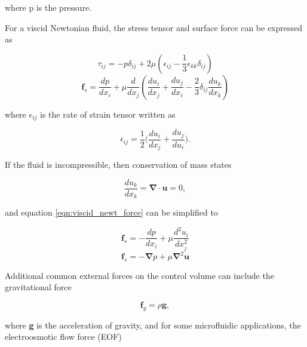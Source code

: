 \noindent where p is the pressure. 

\par For a viscid Newtonian fluid, the stress tensor and surface force can be expressed as

\begin{equation}
    \tau_{ij} = -p\delta_{ij} + 2\mu(\epsilon_{ij} - \frac{1}{3}\epsilon_{kk}\delta_{ij})
\end{equation}
\begin{equation}
    \textbf{f}_s = \frac{dp}{dx_i} + \mu \frac{d}{dx_j}(\frac{du_i}{dx_j} + \frac{du_j}{dx_i} - \frac{2}{3}\delta_{ij}\frac{du_k}{dx_k})
    \label{eqn:viscid_newt_force}
\end{equation}

\noindent where $\epsilon_{ij}$ is the rate of strain tensor written as 

\begin{equation}
    \epsilon_{ij} = \frac{1}{2} \Big(\frac{du_i}{dx_j} + \frac{du_j}{du_i}\Big).
\end{equation}

\noindent If the fluid is incompressible, then conservation of mass states

\begin{equation}
    \frac{du_k}{dx_k} = \boldsymbol{\nabla} \cdot \textbf{u} = 0,
    \label{eqn:incompressible_cons_mass}
\end{equation}

\noindent and equation \ref{eqn:viscid_newt_force} can be simplified to 

\begin{equation}
    \textbf{f}_s = -\frac{dp}{dx_i} + \mu \frac{d^2u_i}{dx^2_j}
\end{equation}
\begin{equation}
    \textbf{f}_s = -\boldsymbol{\nabla}p + \mu\boldsymbol{\nabla}^2\textbf{u}
    \label{eqn:viscous_pressure_force}
\end{equation}

\par Additional common external forces on the control volume can include the gravitational force

\begin{equation}
    \textbf{f}_g = \rho \textbf{g},
    \label{eqn:gravity_force}
\end{equation}

\noindent where \textbf{g} is the acceleration of gravity, and for some microfluidic applications, the electroosmotic flow force (EOF)

